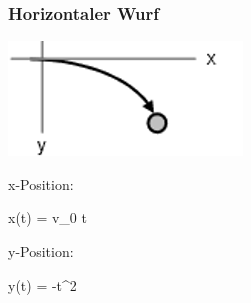 \subsubsection{Horizontaler Wurf }
\begin{minipage}{\textwidth}	
	\begin{minipage}{0.2\textwidth}
		\includegraphics[width=\columnwidth]{./Images/HoriWurf.png}
	\end{minipage}%
	\begin{minipage}{0.25\textwidth}	
		x-Position:
		\begin{formula}
			{x(t) = v_0 \cdot t} 
		\end{formula}
		
		y-Position:
		\begin{formula}
			{y(t) = -\frac{g}{2}t^2}
		\end{formula}	
	\end{minipage}
\end{minipage}

